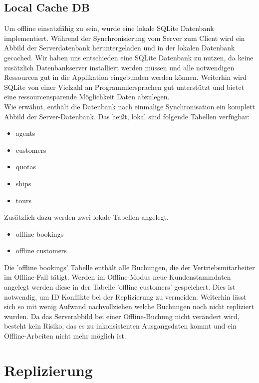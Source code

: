 \documentclass[12pt,a4paper,ngerman,english]{report}
\begin{document}
\subsection{Local Cache DB}
Um offline einsatzfähig zu sein, wurde eine lokale SQLite Datenbank implementiert. Während der Synchronisierung vom Server zum Client wird ein Abbild der Serverdatenbank heruntergeladen und in der lokalen Datenbank gecached. Wir haben uns entschieden eine SQLite Datenbank zu nutzen, da keine zusätzlich Datenbankserver installiert werden müssen und alle notwendigen Ressourcen gut in die Applikation eingebunden werden können. Weiterhin wird SQLite von einer Vielzahl an Programmiersprachen gut unterstützt und bietet eine ressourcensparende Möglichkeit Daten abzulegen. \\
Wie erwähnt, enthält die Datenbank nach einmalige Synchronisation ein komplett Abbild der Server-Datenbank. Das heißt, lokal sind folgende Tabellen verfügbar:
\begin{itemize}
	\setlength\itemsep{0.1em}
	\item agents
	\item customers
	\item quotas
	\item ships
	\item tours
\end{itemize}
Zusätzlich dazu werden zwei lokale Tabellen angelegt.
\begin{itemize}
	\setlength\itemsep{0.1em}
	\item offline bookings
	\item offline customers
\end{itemize}
Die 'offline bookings' Tabelle enthält alle Buchungen, die der Vertriebsmitarbeiter im Offline-Fall tätigt. Werden im Offline-Modus neue Kundenstammdaten angelegt werden diese in der Tabelle 'offline customers' gespeichert. Dies ist notwendig, um ID Konflikte bei der Replizierung zu vermeiden. Weiterhin lässt sich so mit wenig Aufwand nachvollziehen welche Buchungen noch nicht repliziert wurden. Da das Serverabbild bei einer Offline-Buchung nicht verändert wird, besteht kein Risiko, das es zu inkonsistenten Ausgangsdaten kommt und ein Offline-Arbeiten nicht mehr möglich ist.

\section{Replizierung}
\label{sec:Replizierung}
\end{document}
